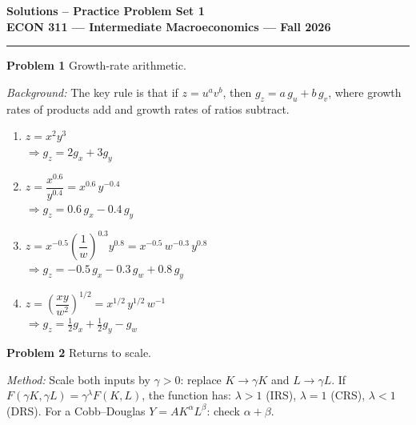 \documentclass[12pt]{article}
\newenvironment{soln}{%
  \begin{tcolorbox}[
    breakable,
    colback=blue!4!white,
    colframe=blue!50!black,
    title={\textbf{Solution}},
    fonttitle=\small,
    left=4pt, right=4pt, top=4pt, bottom=4pt
  ]
}{%
  \end{tcolorbox}
}
\begin{document}
\begin{center}
{\LARGE \textbf{Solutions -- Practice Problem Set 1}}\\[10pt]
  {\large \textbf{ECON 311 --- Intermediate Macroeconomics --- Fall 2026}}\\[6pt]

\end{center}

\bigskip\hrule\bigskip



\noindent\textbf{Problem 1} \quad Growth-rate arithmetic.

\bigskip
\textit{Background:} The key rule is that if $z = u^a v^b$, then
$g_z = a\,g_u + b\,g_v$, where growth rates of products add and growth
rates of ratios subtract.

\begin{soln}
\begin{enumerate}[label=(\alph*),leftmargin=2em,itemsep=6pt]
  \item $z = x^2 y^3$ \\
        $\Rightarrow g_z = 2g_x + 3g_y$

  \item $z = \dfrac{x^{0.6}}{y^{0.4}} = x^{0.6}\,y^{-0.4}$ \\
        $\Rightarrow g_z = 0.6\,g_x - 0.4\,g_y$

  \item $z = x^{-0.5}\left(\dfrac{1}{w}\right)^{0.3}y^{0.8}
             = x^{-0.5}\,w^{-0.3}\,y^{0.8}$ \\
        $\Rightarrow g_z = -0.5\,g_x - 0.3\,g_w + 0.8\,g_y$

  \item $z = \left(\dfrac{xy}{w^2}\right)^{1/2} = x^{1/2}\,y^{1/2}\,w^{-1}$ \\
        $\Rightarrow g_z = \tfrac{1}{2}g_x + \tfrac{1}{2}g_y - g_w$
\end{enumerate}
\end{soln}

\bigskip

\noindent\textbf{Problem 2} \quad Returns to scale.

\bigskip
\textit{Method:} Scale both inputs by $\gamma > 0$:
replace $K \to \gamma K$ and $L \to \gamma L$.
If $F(\gamma K, \gamma L) = \gamma^\lambda F(K,L)$, the function has:
$\lambda>1$ (IRS), $\lambda=1$ (CRS), $\lambda<1$ (DRS).
For a Cobb--Douglas $Y = AK^\alpha L^\beta$: check $\alpha+\beta$.
\end{document}
